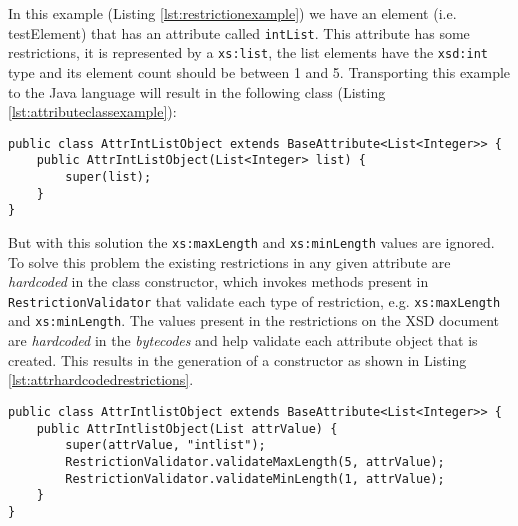 \noindent
In this example (Listing \ref{lst:restrictionexample}) we have an element (i.e. testElement) that has an attribute called \texttt{intList}. This attribute has some restrictions, it is represented by a \texttt{xs:list}, the list elements have the \texttt{xsd:int} type and its element count should be between 1 and 5. Transporting this example to the Java language will result in the following class (Listing \ref{lst:attributeclassexample}):

\bigskip


\begin{minipage}{\linewidth}
\begin{lstlisting}[caption={Attribute Class Example},captionpos=b,label={lst:attributeclassexample}]
public class AttrIntListObject extends BaseAttribute<List<Integer>> {
    public AttrIntListObject(List<Integer> list) {
        super(list);
    }
}
\end{lstlisting}
\end{minipage}

\noindent
But with this solution the \texttt{xs:maxLength} and \texttt{xs:minLength} values are ignored. To solve this problem the existing restrictions in any given attribute are \textit{hardcoded} in the class constructor, which invokes methods present in \texttt{RestrictionValidator} that validate each type of restriction, e.g. \texttt{xs:maxLength} and \texttt{xs:minLength}. The values present in the restrictions on the \ac{XSD} document are \textit{hardcoded} in the \textit{bytecodes} and help validate each attribute object that is created. This results in the generation of a constructor as shown in Listing \ref{lst:attrhardcodedrestrictions}.

\bigskip


\begin{minipage}{\linewidth}
\begin{lstlisting}[caption={Attribute Static Constructor Restrictions},captionpos=b,label={lst:attrhardcodedrestrictions}]
public class AttrIntlistObject extends BaseAttribute<List<Integer>> {
    public AttrIntlistObject(List attrValue) {
        super(attrValue, "intlist");
        RestrictionValidator.validateMaxLength(5, attrValue);
        RestrictionValidator.validateMinLength(1, attrValue);
    }
}

\end{lstlisting}
\end{minipage}

